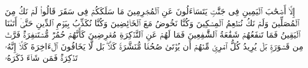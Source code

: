\stopbuffer
\startbuffer[\q:74:39]
إِلَّاۤ أَصۡحَٰبَ ٱلۡیَمِینِ%
\stopbuffer
\startbuffer[\q:74:40]
فِی جَنَّٰتࣲ یَتَسَاۤءَلُونَ%
\stopbuffer
\startbuffer[\q:74:41]
عَنِ ٱلۡمُجۡرِمِینَ%
\stopbuffer
\startbuffer[\q:74:42]
مَا سَلَكَكُمۡ فِی سَقَرَ%
\stopbuffer
\startbuffer[\q:74:43]
قَالُوا۟ لَمۡ نَكُ مِنَ ٱلۡمُصَلِّینَ%
\stopbuffer
\startbuffer[\q:74:44]
وَلَمۡ نَكُ نُطۡعِمُ ٱلۡمِسۡكِینَ%
\stopbuffer
\startbuffer[\q:74:45]
وَكُنَّا نَخُوضُ مَعَ ٱلۡخَاۤئِضِینَ%
\stopbuffer
\startbuffer[\q:74:46]
وَكُنَّا نُكَذِّبُ بِیَوۡمِ ٱلدِّینِ%
\stopbuffer
\startbuffer[\q:74:47]
حَتَّىٰۤ أَتَىٰنَا ٱلۡیَقِینُ%
\stopbuffer
\startbuffer[\q:74:48]
فَمَا تَنفَعُهُمۡ شَفَٰعَةُ ٱلشَّٰفِعِینَ%
\stopbuffer
\startbuffer[\q:74:49]
فَمَا لَهُمۡ عَنِ ٱلتَّذۡكِرَةِ مُعۡرِضِینَ%
\stopbuffer
\startbuffer[\q:74:50]
كَأَنَّهُمۡ حُمُرࣱ مُّسۡتَنفِرَةࣱ%
\stopbuffer
\startbuffer[\q:74:51]
فَرَّتۡ مِن قَسۡوَرَةِۭ%
\stopbuffer
\startbuffer[\q:74:52]
بَلۡ یُرِیدُ كُلُّ ٱمۡرِئࣲ مِّنۡهُمۡ أَن یُؤۡتَىٰ صُحُفࣰا مُّنَشَّرَةࣰ%
\stopbuffer
\startbuffer[\q:74:53]
كَلَّاۖ بَل لَّا یَخَافُونَ ٱلۡءَاخِرَةَ%
\stopbuffer
\startbuffer[\q:74:54]
كَلَّاۤ إِنَّهُۥ تَذۡكِرَةࣱ%
\stopbuffer
\startbuffer[\q:74:55]
فَمَن شَاۤءَ ذَكَرَهُۥ%
\stopbuffer
